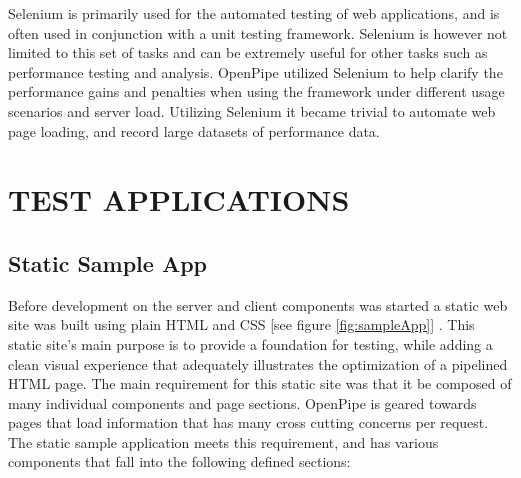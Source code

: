 \documentclass[12pt]{report}
\begin{document}
Selenium is primarily used for the automated testing of web applications, and is often used in conjunction with a unit testing framework.  Selenium is however not limited to this set of tasks and can be extremely useful for other tasks such as performance testing and analysis. OpenPipe utilized Selenium to help clarify the performance gains and penalties when using the framework under different usage scenarios and server load. Utilizing Selenium it became trivial to automate web page loading, and record large datasets of performance data.







\chapter{TEST APPLICATIONS}

\section{Static Sample App}
Before development on the server and client components was started a static web site was built using plain HTML and CSS [see figure \ref{fig:sampleApp}] . This static site’s main purpose is to provide a foundation for testing, while adding a clean visual experience that adequately illustrates the optimization of a pipelined HTML page. The main requirement for this static site was that it be composed of many individual components and page sections. OpenPipe is geared towards pages that load information that has many cross cutting concerns per request. The static sample application meets this requirement, and has various components that fall into the following defined sections:
\end{document}
